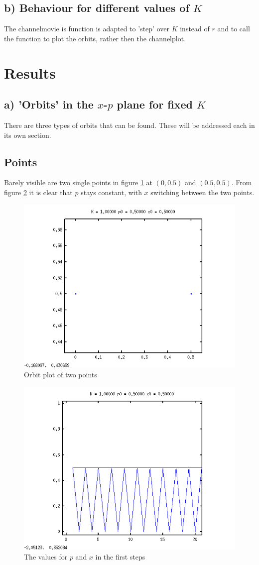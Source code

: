 \documentclass[a4paper,11pt]{article}
\begin{document}
\subsection*{b) Behaviour for different values of $K$}
The channelmovie is function is adapted to 'step' over $K$ instead of $r$ and to call the function to plot the orbits, rather then the channelplot.

\section{Results}
\subsection*{a) 'Orbits' in the $x$-$p$ plane for fixed $K$}
There are three types of orbits that can be found. These will be addressed each in its own section.
\subsection*{Points}
Barely visible are two single points in figure \ref{pointorbit} at $(0,0.5)$ and $(0.5,0.5)$. From figure \ref{pointval} it is clear that $p$ stays constant, with $x$ switching between the two points.
\begin{figure}[H]
\centering
\includegraphics[width=.8\textwidth]{pointorbit.png}
\caption{Orbit plot of two points}
\label{pointorbit}
\end{figure}
\begin{figure}[H]
\centering
\includegraphics[width=.8\textwidth]{pointsvalues.png}
\caption{The values for $p$ and $x$ in the first steps }
\label{pointval}
\end{figure}
\end{document}
